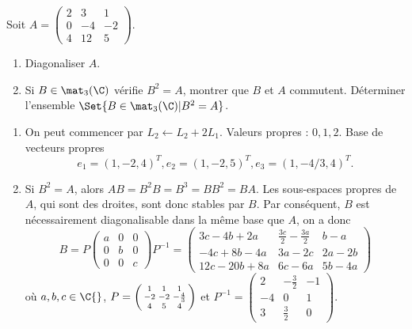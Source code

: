 \begin{enonce}
\begin{exercise}[ID={RMS121/2 E1076, CCP PSI},subtitle={},tags={mpsi}]
Soit $A=\begin{pmatrix} 2&3&1\\ 0&-4&-2\\ 4&12&5\end{pmatrix}$.
\begin{enumerate}
    \item Diagonaliser $A$.
    \item Si $B\in\mat_3(\C)$ vérifie $B^2=A$, montrer que $B$ et $A$ commutent.
      Déterminer l'ensemble $\Set{B\in\mat_3(\C)| B^2=A}$.
\end{enumerate}
\end{exercise}
\begin{solution}
\begin{enumerate}
\item On peut commencer par $L_2 \gets L_2 + 2L_1$.
  Valeurs propres : $0,1,2$. Base de vecteurs propres
\begin{equation*}
    e_1=(1,-2,4)^T,
    e_2=(1,-2,5)^T,
    e_3=(1,-4/3,4)^T.
\end{equation*}

\item Si $B^2=A$, alors $AB=B^2B=B^3=BB^2=BA$.
Les sous-espaces propres de $A$, qui sont des droites, sont donc stables par $B$.
Par conséquent, $B$ est nécessairement diagonalisable dans la même base  que $A$, on a donc 
\begin{equation*}
B=
P
\begin{pmatrix}
a&0&0\\
0&b&0\\
0&0&c
\end{pmatrix}
P^{-1}
=
\begin{pmatrix}
    3c-4 b+2 a & \frac{3 c}{2}-\frac{3 a}{2} & b-a\\
    -4 c+8 b-4 a & 3 a-2 c & 2 a-2 b\\
    12 c-20 b+8 a & 6 c-6 a & 5 b-4 a
\end{pmatrix}
\end{equation*}
 où $a,b,c\in\C{}$,
 $P=
 \left(\begin{smallmatrix}
1 & 1 & 1\cr -2 & -2 & -\frac{4}{3}\cr 4 & 5 & 4
 \end{smallmatrix}\right)$
 et
$P^{-1}=
\left(\begin{smallmatrix}
2 & -\frac{3}{2} & -1\\
-4 & 0 & 1\\
3 & \frac{3}{2} & 0
\end{smallmatrix}\right)
$.
\end{enumerate}
\end{solution}
\end{enonce}
